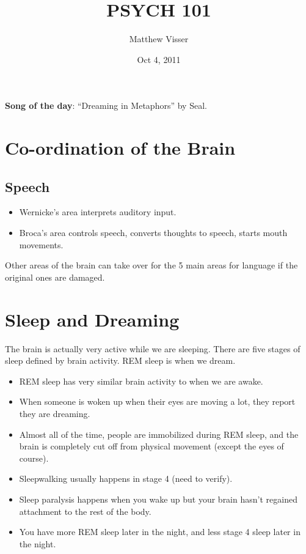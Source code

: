 \documentclass[12pt]{article}
\begin{document}
\title{PSYCH 101}
\author{Matthew Visser}
\date{Oct  4, 2011}
\maketitle

\textbf{Song of the day}: ``Dreaming in Metaphors'' by Seal.

\section{Co-ordination of the Brain}

\subsection{Speech}
\begin{itemize}
	\item Wernicke's area interprets auditory input.
	\item Broca's area controls speech, converts thoughts to speech, starts mouth
		movements.
\end{itemize}

Other areas of the brain can take over for the 5 main areas for language if the
original ones are damaged.


\section{Sleep and Dreaming}

The brain is actually very active while we are sleeping. There are five stages
of sleep defined by brain activity. REM sleep is when we dream.
\begin{itemize}
	\item REM sleep has very similar brain activity to when we are awake.
	\item When someone is woken up when their eyes are moving a lot, they report
		they are dreaming.
	\item Almost all of the time, people are immobilized during REM sleep, and
		the brain is completely cut off from physical movement (except the eyes
		of course).
	\item Sleepwalking usually happens in stage 4 (need to verify).
	\item Sleep paralysis happens when you wake up but your brain hasn't
		regained attachment to the rest of the body.
	\item You have more REM sleep later in the night, and less stage 4 sleep
		later in the night.
\end{itemize}
\end{document}
